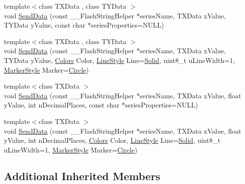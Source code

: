 \begin{DoxyCompactItemize}
\item 
{\footnotesize template$<$class T\-X\-Data , class T\-Y\-Data $>$ }\\void \hyperlink{class_x_y_plot_ad6f8fbd31b4b94aaf47bacf2526d7737}{Send\-Data} (const \-\_\-\-\_\-\-Flash\-String\-Helper $\ast$series\-Name, T\-X\-Data x\-Value, T\-Y\-Data y\-Value, const char $\ast$series\-Properties=N\-U\-L\-L)
\item 
{\footnotesize template$<$class T\-X\-Data , class T\-Y\-Data $>$ }\\void \hyperlink{class_x_y_plot_afe1bf4cbb0c50ef5e12d327679111546}{Send\-Data} (const \-\_\-\-\_\-\-Flash\-String\-Helper $\ast$series\-Name, T\-X\-Data x\-Value, T\-Y\-Data y\-Value, \hyperlink{class_plot_af4d6704578791a812f3f78617adc7040}{Colors} Color, \hyperlink{class_plot_a05a5ea232f5115847a9861a9660205c7}{Line\-Style} Line=\hyperlink{class_plot_a05a5ea232f5115847a9861a9660205c7a4a144f2b97cc3762d40863bde0853f22}{Solid}, uint8\-\_\-t u\-Line\-Width=1, \hyperlink{class_plot_a888bde9c76bb38843a5ab09097cbeeab}{Marker\-Style} Marker=\hyperlink{class_plot_a888bde9c76bb38843a5ab09097cbeeaba9eb079a6c0fcf4d7125147671b071e2e}{Circle})
\item 
{\footnotesize template$<$class T\-X\-Data $>$ }\\void \hyperlink{class_x_y_plot_adb75abc61f0cfe383f224bd1f5bf3f22}{Send\-Data} (const \-\_\-\-\_\-\-Flash\-String\-Helper $\ast$series\-Name, T\-X\-Data x\-Value, float y\-Value, int n\-Decimal\-Places, const char $\ast$series\-Properties=N\-U\-L\-L)
\item 
{\footnotesize template$<$class T\-X\-Data $>$ }\\void \hyperlink{class_x_y_plot_ab31b7d4dd77799d25c79f1461d3826fb}{Send\-Data} (const \-\_\-\-\_\-\-Flash\-String\-Helper $\ast$series\-Name, T\-X\-Data x\-Value, float y\-Value, int n\-Decimal\-Places, \hyperlink{class_plot_af4d6704578791a812f3f78617adc7040}{Colors} Color, \hyperlink{class_plot_a05a5ea232f5115847a9861a9660205c7}{Line\-Style} Line=\hyperlink{class_plot_a05a5ea232f5115847a9861a9660205c7a4a144f2b97cc3762d40863bde0853f22}{Solid}, uint8\-\_\-t u\-Line\-Width=1, \hyperlink{class_plot_a888bde9c76bb38843a5ab09097cbeeab}{Marker\-Style} Marker=\hyperlink{class_plot_a888bde9c76bb38843a5ab09097cbeeaba9eb079a6c0fcf4d7125147671b071e2e}{Circle})
\end{DoxyCompactItemize}
\subsection*{Additional Inherited Members}


